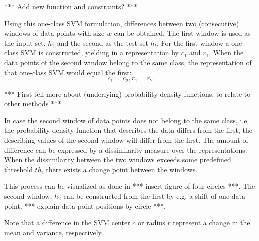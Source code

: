 *** Add new function and constraints? ***

Using this one-class SVM formulation, differences between two (consecutive) windows of data points with size $w$ can be obtained.
The first window is used as the input set, $h_1$ and the second as the test set $h_t$.
For the first window a one-class SVM is constructed, yielding in a representation by $c_1$ and $r_1$.
When the data points of the second window belong to the same class, the representation of that one-class SVM would equal the first:
\begin{equation}
  c_1 = c_2, r_1 = r_2
\end{equation}

*** First tell more about (underlying) probability density functions, to relate to other methods ***

In case the second window of data points does not belong to the same class, i.e. the probability density function that describes the data differs from the first, the describing values of the second window will differ from the first.
The amount of difference can be expressed by a dissimilarity measure over the representations.
When the dissimilarity between the two windows exceeds some predefined threshold $th$, there exists a change point between the windows.

This process can be visualized as done in *** insert figure of four circles ***. The second window, $h_2$ can be constructed from the first by e.g. a shift of one data point. *** explain data point positions by circle ***.

Note that a difference in the SVM center $c$ or radius $r$ represent a change in the mean and variance, respectively.

